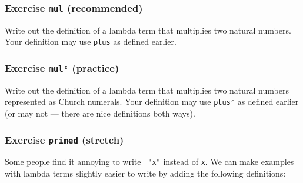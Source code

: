 \hypertarget{exercise-mul-recommended}{%
\subsubsection{\texorpdfstring{Exercise \texttt{mul}
(recommended)}{Exercise mul (recommended)}}\label{exercise-mul-recommended}}

Write out the definition of a lambda term that multiplies two natural
numbers. Your definition may use \texttt{plus} as defined earlier.

\begin{fence}
\begin{code}%
\>[0]\<%
\end{code}
\end{fence}

\hypertarget{exercise-mulux1d9c-practice}{%
\subsubsection{\texorpdfstring{Exercise \texttt{mulᶜ}
(practice)}{Exercise mulᶜ (practice)}}\label{exercise-mulux1d9c-practice}}

Write out the definition of a lambda term that multiplies two natural
numbers represented as Church numerals. Your definition may use
\texttt{plusᶜ} as defined earlier (or may not --- there are nice
definitions both ways).

\begin{fence}
\begin{code}%
\>[0]\<%
\end{code}
\end{fence}

\hypertarget{Lambda-primed}{%
\subsubsection{\texorpdfstring{Exercise \texttt{primed}
(stretch)}{Exercise primed (stretch)}}\label{Lambda-primed}}

Some people find it annoying to write \texttt{\textasciigrave{}\ "x"}
instead of \texttt{x}. We can make examples with lambda terms slightly
easier to write by adding the following definitions:

